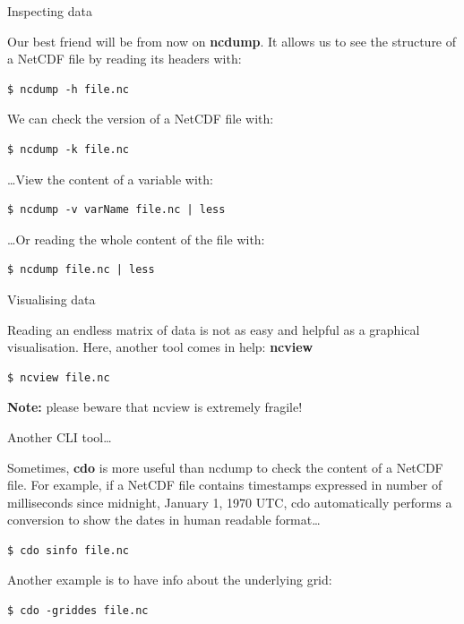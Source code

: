 \documentclass[9pt]{beamer}
\begin{document}
\begin{frame}[fragile]{Inspecting data}

Our best friend will be from now on \textbf{ncdump}. It allows us to see the structure of a NetCDF file by reading its headers with: 

\begin{verbatim}
$ ncdump -h file.nc
\end{verbatim}

\pause We can check the version of a NetCDF file with:

\begin{verbatim}
$ ncdump -k file.nc
\end{verbatim}

\pause \dots View the content of a variable with:

\begin{verbatim}
$ ncdump -v varName file.nc | less
\end{verbatim}

\pause \dots Or reading the whole content of the file with:

\begin{verbatim}
$ ncdump file.nc | less
\end{verbatim}

\end{frame}

\begin{frame}[fragile]{Visualising data}

Reading an endless matrix of data is not as easy and helpful as a graphical visualisation. Here, another tool comes in help: \textbf{ncview}

\begin{verbatim}
$ ncview file.nc
\end{verbatim}
    
\vfill    
    
\textbf{Note:} please beware that ncview is extremely fragile! 
    
\end{frame}

\begin{frame}[fragile]{Another CLI tool\dots}
    
Sometimes, \textbf{cdo} is more useful than ncdump to check the content of a NetCDF file. For example, if a NetCDF file contains timestamps expressed in number of milliseconds since midnight, January 1, 1970 UTC, cdo automatically performs a conversion to show the dates in human readable format\dots 

\begin{verbatim}
$ cdo sinfo file.nc    
\end{verbatim}

\pause Another example is to have info about the underlying grid:

\begin{verbatim}
$ cdo -griddes file.nc
\end{verbatim}

\end{frame}
\end{document}
